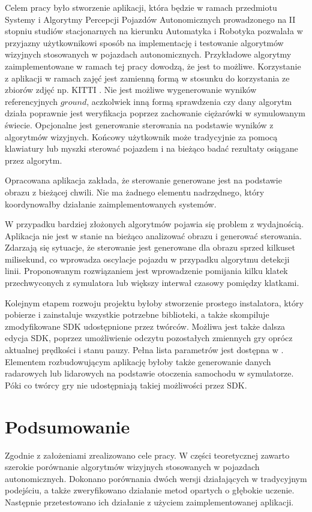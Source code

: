 Celem pracy było stworzenie aplikacji, która będzie w ramach przedmiotu Systemy i Algorytmy Percepcji Pojazdów Autonomicznych prowadzonego na II stopniu studiów stacjonarnych na kierunku Automatyka i Robotyka pozwalała w przyjazny użytkownikowi sposób na implementację i testowanie algorytmów wizyjnych stosowanych w pojazdach autonomicznych. 
Przykładowe algorytmy zaimplementowane w ramach tej pracy dowodzą, że jest to możliwe. 
Korzystanie z aplikacji w ramach zajęć jest zamienną formą w stosunku do korzystania ze zbiorów zdjęć np. KITTI \cite{W6}. %
Nie jest możliwe wygenerowanie wyników referencyjnych $ground$, aczkolwiek inną formą sprawdzenia czy dany algorytm działa poprawnie jest weryfikacja poprzez zachowanie ciężarówki w symulowanym świecie. %
Opcjonalne jest generowanie sterowania na podstawie wyników z algorytmów wizyjnych. 
Końcowy użytkownik może tradycyjnie za pomocą klawiatury lub myszki sterować pojazdem i na bieżąco badać rezultaty osiągane przez algorytm.

Opracowana aplikacja zakłada, że sterowanie generowane jest na podstawie obrazu z bieżącej chwili. Nie ma żadnego elementu nadrzędnego, który koordynowałby działanie zaimplementowanych systemów.

W przypadku bardziej złożonych algorytmów pojawia się problem z wydajnością. Aplikacja nie jest w stanie na bieżąco analizować obrazu i generować sterowania. Zdarzają się sytuacje, że sterowanie jest generowane dla obrazu sprzed kilkuset milisekund, co wprowadza oscylacje pojazdu w przypadku algorytmu detekcji linii.
Proponowanym rozwiązaniem jest wprowadzenie pomijania kilku klatek przechwyconych z symulatora lub większy interwał czasowy pomiędzy klatkami.

Kolejnym etapem rozwoju projektu byłoby stworzenie prostego instalatora, który pobierze i zainstaluje wszystkie potrzebne biblioteki, a także skompiluje zmodyfikowane SDK udostępnione przez twórców. 
Możliwa jest także dalsza edycja SDK, poprzez umożliwienie odczytu pozostałych zmiennych gry oprócz aktualnej prędkości i stanu pauzy. 
Pełna lista parametrów jest dostępna w \cite{S3}. 
Elementem rozbudowującym aplikację byłoby także generowanie danych radarowych lub lidarowych na podstawie otoczenia samochodu w symulatorze. 
Póki co twórcy gry nie udostępniają takiej możliwości przez SDK.





\chapter{Podsumowanie}
Zgodnie z założeniami zrealizowano cele pracy. 
W części teoretycznej zawarto szerokie porównanie algorytmów wizyjnych stosowanych w pojazdach autonomicznych. 
Dokonano porównania dwóch wersji działających w tradycyjnym podejściu, a także zweryfikowano działanie metod opartych o głębokie uczenie. Następnie przetestowano ich działanie z użyciem zaimplementowanej aplikacji. %

